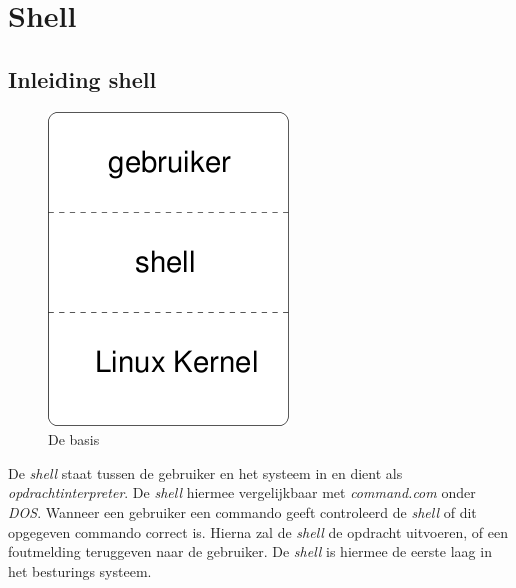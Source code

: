 %
%
%
%

\chapter{Shell}
\section{Inleiding shell}
\begin{figure}[H]
  \begin{center}
    \includegraphics[scale=0.5]{images/shell_intro}
  \end{center}
  \caption{De basis}
  \label{fig:shell}
\end{figure}

De \emph{shell} staat tussen de gebruiker en het systeem in en dient als \emph{opdrachtinterpreter}. De \emph{shell} hiermee vergelijkbaar met \emph{command.com} onder \emph{DOS}. Wanneer een gebruiker een commando geeft controleerd de \emph{shell} of dit opgegeven commando correct is. Hierna zal de \emph{shell} de opdracht uitvoeren, of een foutmelding teruggeven naar de gebruiker. De \emph{shell} is hiermee de eerste laag in het besturings systeem. 

